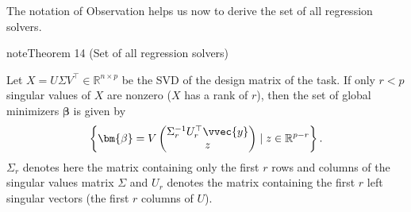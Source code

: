 \documentclass[letterpaper,10pt,english]{jupyterBook}
\begin{document}
\sphinxAtStartPar
The notation of Observation {\hyperref[\detokenize{regression_optimization:obs-sigma-r}]{}} helps us now to derive the set of all regression solvers.
\label{regression_optimization:theorem-4}
\begin{sphinxadmonition}{note}{Theorem 14 (Set of all regression solvers)}



\sphinxAtStartPar
Let \(X=U\Sigma V^\top\in\mathbb{R}^{n\times p}\) be the SVD of the design matrix of the {\hyperref[\detokenize{regression_optimization:regr-task}]{}} task. If only \(r<p\) singular values of \(X\) are nonzero (\(X\) has a rank of \(r\)), then the set of global minimizers \(\bm{\beta}\) is given by
\begin{equation*}
\begin{split}\left\{\bm{\beta}= V\begin{pmatrix}\Sigma_r^{-1} U_r^\top\vvec{y}\\z\end{pmatrix}\mid z\in\mathbb{R}^{p-r} \right\}.\end{split}
\end{equation*}
\(\Sigma_r\) denotes here the matrix containing only the first \(r\) rows and columns of the singular values matrix \(\Sigma\) and \(U_r\) denotes the matrix containing the first \(r\) left singular vectors (the first \(r\) columns of \(U\)).
\end{sphinxadmonition}
\end{document}
